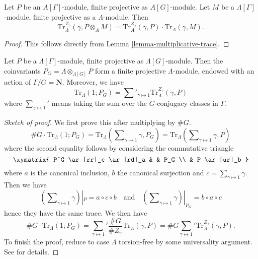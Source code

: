 \begin{lemma}
\label{lemma-weak-trace}
Let $P$ be an $A[\Gamma]$-module, finite projective as $A[G]$-module. Let $M$
be a $\Lambda[\Gamma]$-module, finite projective as a $\Lambda$-module. Then
$$
\text{Tr}_{\Lambda}^{Z_\gamma}(\gamma, P \otimes_A M) =
\text{Tr}_A^{Z_\gamma}(\gamma, P)\cdot \text{Tr}_\Lambda(\gamma, M).
$$
\end{lemma}

\begin{proof}
This follows directly from Lemma \ref{lemma-multiplicative-trace}.
\end{proof}

\begin{lemma}
\label{lemma-trivial-trace}
Let $P$ be a $\Lambda[\Gamma]$-module, finite projective as
$\Lambda[G]$-module. Then the coinvariants
$P_G = \Lambda \otimes_{\Lambda[G]} P$
form a finite projective $\Lambda$-module, endowed with an action of
$\Gamma/G = \mathbf{N}$. Moreover, we have
$$
\text{Tr}_\Lambda(1; P_G) =
\sum\nolimits'_{\gamma \mapsto 1} \text{Tr}_\Lambda^{Z_\gamma}(\gamma, P)
$$
where $\sum_{\gamma\mapsto 1}'$ means taking the sum over the $G$-conjugacy
classes in $\Gamma$.
\end{lemma}

\begin{proof}[Sketch of proof]
We first prove this after multiplying by $\# G$.
$$
\# G\cdot \text{Tr}_\Lambda(1; P_G)
= \text{Tr}_\Lambda(\sum\nolimits_{\gamma\mapsto 1} \gamma, P_G)
= \text{Tr}_\Lambda(\sum\nolimits_{\gamma\mapsto 1} \gamma, P)
$$
where the second equality follows by considering the commutative triangle
$$
\xymatrix{
P^G \ar[rr]_c \ar[rd]_a & & P_G \\
& P \ar[ur]_b
}
$$
where $a$ is the canonical inclusion, $b$ the canonical surjection and $c =
\sum_{\gamma \mapsto 1} \gamma$. Then we have
$$
(\sum\nolimits_{\gamma \mapsto 1} \gamma) |_P = a \circ c \circ b
\quad\text{and}\quad
(\sum\nolimits_{\gamma \mapsto 1} \gamma) |_{P_G} = b \circ a \circ c
$$
hence they have the same trace. We then have
$$
\# G\cdot \text{Tr}_\Lambda(1; P_G)
=
{\sum_{\gamma\mapsto 1}}'
\frac{\# G}{\# Z_\gamma}\text{Tr}_\Lambda(\gamma, P)
= \# G{\sum_{\gamma\mapsto 1}}' \text{Tr}_\Lambda^{Z_\gamma}(\gamma, P).
$$
To finish the proof, reduce to case $\Lambda$ torsion-free by some universality
argument. See \cite{SGA4.5} for details.
\end{proof}

